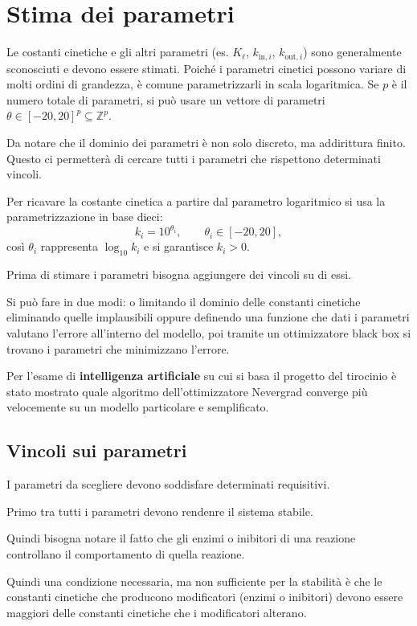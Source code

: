 \chapter{Stima dei parametri}

Le costanti cinetiche e gli altri parametri (es. \(K_\ell\), \(k_{\mathrm{in},i}\), \(k_{\mathrm{out},i}\)) sono generalmente sconosciuti e devono essere stimati. 
Poiché i parametri cinetici possono variare di molti ordini di grandezza, è comune parametrizzarli in scala logaritmica. 
Se \(p\) è il numero totale di parametri, si può usare un vettore di parametri \(\theta\in [-20,20]^p \subseteq \mathbb{Z}^p\).

Da notare che il dominio dei parametri è non solo discreto, ma addirittura finito. Questo ci permetterà di cercare tutti i parametri che rispettono determinati vincoli.

Per ricavare la costante cinetica a partire dal parametro logaritmico si usa la parametrizzazione in base dieci:
\[
k_i = 10^{\theta_i}, \qquad \theta_i \in [-20,20],
\]
così \(\theta_i\) rappresenta \(\log_{10} k_i\) e si garantisce \(k_i>0\).


Prima di stimare i parametri bisogna aggiungere dei vincoli su di essi.

Si può fare in due modi: o limitando il dominio delle constanti cinetiche eliminando quelle implausibili oppure
definendo una funzione che dati i parametri valutano l'errore all'interno del modello, poi tramite un ottimizzatore black box si trovano 
i parametri che minimizzano l'errore.

Per l'esame di \textbf{intelligenza artificiale} su cui si basa il progetto del tirocinio è stato mostrato
quale algoritmo dell'ottimizzatore Nevergrad converge più velocemente su un modello particolare e semplificato.

\section{Vincoli sui parametri}

I parametri da scegliere devono soddisfare determinati requisitivi.

Primo tra tutti i parametri devono rendenre il sistema stabile.

Quindi bisogna notare il fatto che gli enzimi o inibitori di una reazione controllano il comportamento di quella reazione.

Quindi una condizione necessaria, ma non sufficiente per la stabilità è che le constanti cinetiche che producono modificatori (enzimi o inibitori)
devono essere maggiori delle constanti cinetiche che i modificatori alterano.

